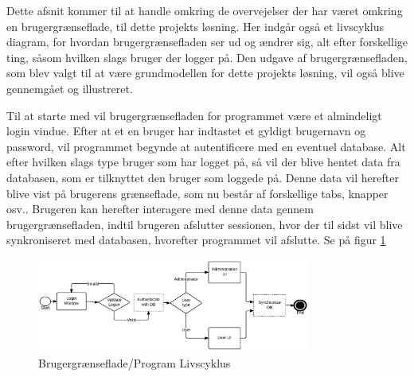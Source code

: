 Dette afsnit kommer til at handle omkring de overvejelser der har været omkring en brugergrænseflade, til dette projekts løsning. Her indgår også et livscyklus diagram, for hvordan brugergrænsefladen ser ud og ændrer sig, alt efter forskellige ting, såsom hvilken slags bruger der logger på. Den udgave af brugergrænsefladen, som blev valgt til at være grundmodellen for dette projekts løsning, vil også blive gennemgået og illustreret.

Til at starte med vil brugergrænsefladen for programmet være et almindeligt login vindue. Efter at et en bruger har indtastet et gyldigt brugernavn og password, vil programmet begynde at autentificere med en eventuel database. Alt efter hvilken slags type bruger som har logget på, så vil der blive hentet data fra databasen, som er tilknyttet den bruger som loggede på. Denne data vil herefter blive vist på brugerens grænseflade, som nu består af forskellige tabs, knapper osv.. Brugeren kan herefter interagere med denne data gennem brugergrænsefladen, indtil brugeren afslutter sessionen, hvor der til sidst vil blive synkroniseret med databasen, hvorefter programmet vil afslutte. Se på figur \ref{LifeCycle}

\begin{figure}[H]
\centering
\includegraphics[width=0.8\textwidth]{Billeder/LifeCycle.png}
\caption{Brugergrænseflade/Program Livscyklus}
\label{LifeCycle}
\end{figure}